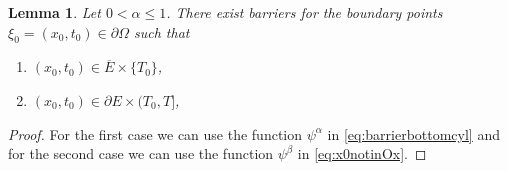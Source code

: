 \documentclass[11pt]{article}
\newtheorem{lem}[thm]{Lemma}
\numberwithin{equation}{section}
\theoremstyle{definition}
\begin{document}
\begin{lem}\label{lem:barriersgen}
    Let $0<\alpha \leq 1$. There exist barriers for the boundary points $\xi_0=(x_0,t_0) \in \partial \Omega$ such that
        \begin{enumerate}
        \item $(x_0, t_0) \in  \overline{E} \times \{T_0\}$,
        \item $(x_0, t_0) \in \partial E \times (T_0, T]$,
    \end{enumerate}
\end{lem}
\begin{proof}
 For the first case we can use the function $\psi^{\alpha}$ in \eqref{eq:barrierbottomcyl} and for the second case we can use the function $\psi^{\beta}$ in \eqref{eq:x0notinOx}. 

\end{proof}
\end{document}
